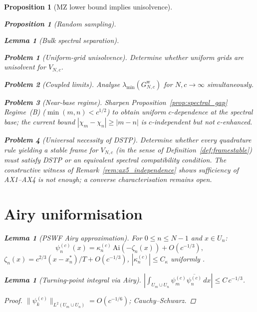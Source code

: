 \documentclass[12pt,a4paper]{amsart}
\newtheorem{lemma}[theorem]{Lemma}
\newtheorem{proposition}[theorem]{Proposition}
\theoremstyle{definition}
\newtheorem{problem}{Problem}[section]
\begin{document}
\begin{proposition}[MZ lower bound implies unisolvence]
\begin{proposition}[Random sampling]
\begin{lemma}[Bulk spectral separation]
\begin{problem}[Uniform-grid unisolvence]
Determine whether uniform grids are unisolvent for $V_{N,c}$.
\end{problem}

\begin{problem}[Coupled limits]
Analyse $\lambda_{\min}(G^{\mathrm{w}}_{N,c})$ for $N,c\to\infty$
simultaneously.
\end{problem}

\begin{problem}[Near-base regime]
Sharpen Proposition~\ref{prop:spectral_gap} Regime~(B)
($\min(m,n)<c^{1/2}$) to obtain uniform $c$-dependence at the
spectral base; the current bound $|\chi_m-\chi_n|\ge|m-n|$ is
$c$-independent but not $c$-enhanced.
\end{problem}

\begin{problem}[Universal necessity of DSTP]
Determine whether every quadrature rule yielding a stable frame for
$V_{N,c}$ (in the sense of Definition~\ref{def:framestable}) must
satisfy DSTP or an equivalent spectral compatibility condition.
The constructive witness of Remark~\ref{rem:ax5_independence} shows
sufficiency of \textup{AX1--AX4} is not enough; a converse
characterisation remains open.
\end{problem}

\appendix
\section{Airy uniformisation}\label{app:airy}

\begin{lemma}[PSWF Airy approximation]\label{lem:airy_approx}
For $0\le n\le N-1$ and $x\in U_n$:
\[
  \psi_n^{(c)}(x)
  =\kappa_n^{(c)}\,\mathrm{Ai}(-\zeta_n(x))+O(c^{-1/3}),
\]
$\zeta_n(x)=c^{2/3}(x-x_n^*)/T+O(c^{-1/3})$,
$|\kappa_n^{(c)}|\le C_\kappa$ uniformly
\cite{Olver1974,OsipovRokhlinXiao}.
\end{lemma}

\begin{lemma}[Turning-point integral via Airy]\label{lem:airy_bound}
$|\int_{U_m\cup U_n}\psi_m^{(c)}\overline{\psi_n^{(c)}}\,dx|
\le C\,c^{-1/3}$.
\end{lemma}
\begin{proof}
$\|\psi_k^{(c)}\|_{L^2(U_m\cup U_n)}=O(c^{-1/6})$; Cauchy--Schwarz.
\end{proof}


\end{lemma}
\end{proposition}
\end{proposition}
\end{document}
